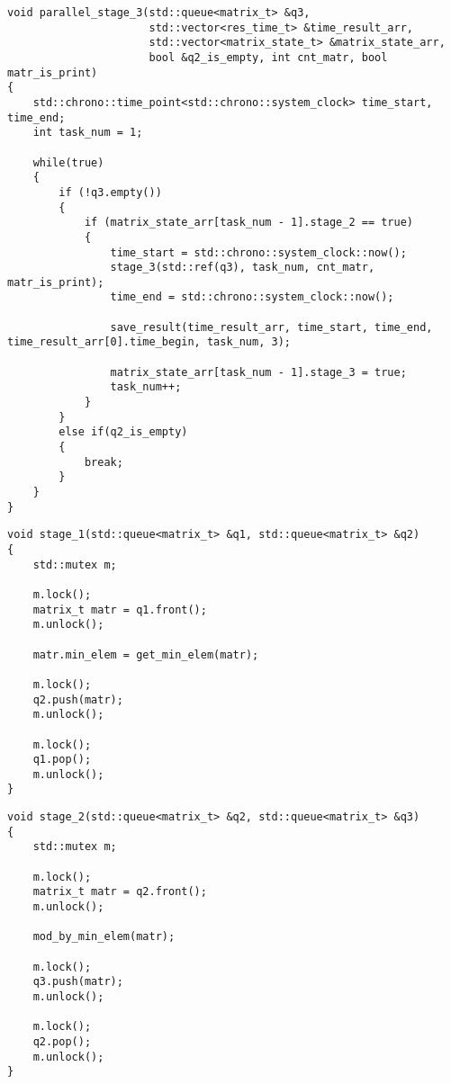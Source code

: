 \clearpage

\begin{center}
\captionsetup{justification=raggedright,singlelinecheck=off}
\begin{lstlisting}[label=lst:parallel_stage_3,caption=Функция 3-ей ленты конвейерной обработки матрицы]
void parallel_stage_3(std::queue<matrix_t> &q3, 
                      std::vector<res_time_t> &time_result_arr,
                      std::vector<matrix_state_t> &matrix_state_arr, 
                      bool &q2_is_empty, int cnt_matr, bool matr_is_print)
{
    std::chrono::time_point<std::chrono::system_clock> time_start, time_end;
    int task_num = 1;

    while(true)
    {      
        if (!q3.empty())
        {   
            if (matrix_state_arr[task_num - 1].stage_2 == true)
            {
                time_start = std::chrono::system_clock::now();
                stage_3(std::ref(q3), task_num, cnt_matr, matr_is_print);
                time_end = std::chrono::system_clock::now();

                save_result(time_result_arr, time_start, time_end, time_result_arr[0].time_begin, task_num, 3);

                matrix_state_arr[task_num - 1].stage_3 = true;
                task_num++;
            }
        }
        else if(q2_is_empty)
        {
            break;
        } 
    }
}
\end{lstlisting}
\end{center}

\clearpage

\begin{center}
\captionsetup{justification=raggedright,singlelinecheck=off}
\begin{lstlisting}[label=lst:stage_1,caption=Функция реализации 1-ого этапа обработки матрицы]
void stage_1(std::queue<matrix_t> &q1, std::queue<matrix_t> &q2)
{
	std::mutex m;

	m.lock();
	matrix_t matr = q1.front();
	m.unlock();

	matr.min_elem = get_min_elem(matr);

	m.lock();
	q2.push(matr);
	m.unlock();

	m.lock();
	q1.pop();
	m.unlock();
}
\end{lstlisting}
\end{center}

\begin{center}
\captionsetup{justification=raggedright,singlelinecheck=off}
\begin{lstlisting}[label=lst:stage_2,caption=Функция реализации 2-ого этапа обработки матрицы]
void stage_2(std::queue<matrix_t> &q2, std::queue<matrix_t> &q3)
{
	std::mutex m;

	m.lock();
	matrix_t matr = q2.front();
	m.unlock();

	mod_by_min_elem(matr);
	
	m.lock();
	q3.push(matr);
	m.unlock();
	
	m.lock();
	q2.pop();
	m.unlock();
}
\end{lstlisting}
\end{center}

